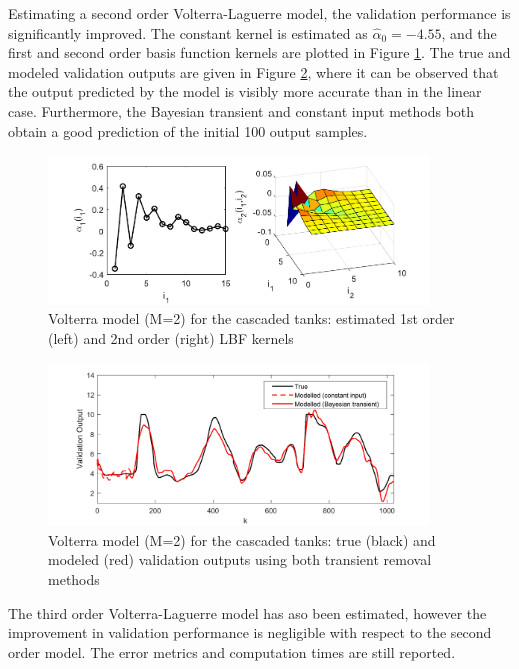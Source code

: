 Estimating a second order Volterra-Laguerre model, the validation performance is significantly improved. The constant kernel is estimated as $\hat{\alpha}_0 = -4.55$, and the first and second order basis function kernels are plotted in Figure \ref{fig:2ndOrderTankEst}. The true and modeled validation outputs are given in Figure \ref{fig:2ndOrderTankVal}, where it can be observed that the output predicted by the model is visibly more accurate than in the linear case. Furthermore, the Bayesian transient and constant input methods both obtain a good prediction of the initial 100 output samples. 

\begin{figure}[h]
\centering
\includegraphics[width=0.9\textwidth]{Chapter6_CaseStudies/Kernels2ndOrder_CT_Coloured.pdf}
\caption{Volterra model (M=2) for the cascaded tanks: estimated 1st order (left) and 2nd order (right) LBF kernels}
\label{fig:2ndOrderTankEst}
\end{figure}

\begin{figure}[h]
\centering
\includegraphics[width=0.9\textwidth]{Chapter6_CaseStudies/2ndOrderValidation.pdf}
\caption{Volterra model (M=2) for the cascaded tanks: true (black) and modeled (red) validation outputs using both transient removal methods}
\label{fig:2ndOrderTankVal}
\end{figure}

The third order Volterra-Laguerre model has aso been estimated, however the improvement in validation performance is negligible with respect to the second order model. The error metrics and computation times are still reported.


